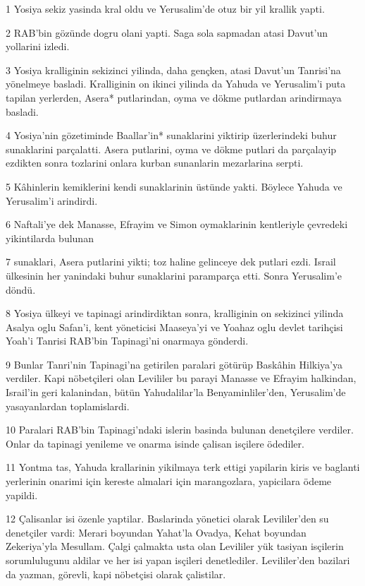 \par 1 Yosiya sekiz yasinda kral oldu ve Yerusalim'de otuz bir yil krallik yapti.
\par 2 RAB'bin gözünde dogru olani yapti. Saga sola sapmadan atasi Davut'un yollarini izledi.
\par 3 Yosiya kralliginin sekizinci yilinda, daha gençken, atasi Davut'un Tanrisi'na yönelmeye basladi. Kralliginin on ikinci yilinda da Yahuda ve Yerusalim'i puta tapilan yerlerden, Asera* putlarindan, oyma ve dökme putlardan arindirmaya basladi.
\par 4 Yosiya'nin gözetiminde Baallar'in* sunaklarini yiktirip üzerlerindeki buhur sunaklarini parçalatti. Asera putlarini, oyma ve dökme putlari da parçalayip ezdikten sonra tozlarini onlara kurban sunanlarin mezarlarina serpti.
\par 5 Kâhinlerin kemiklerini kendi sunaklarinin üstünde yakti. Böylece Yahuda ve Yerusalim'i arindirdi.
\par 6 Naftali'ye dek Manasse, Efrayim ve Simon oymaklarinin kentleriyle çevredeki yikintilarda bulunan
\par 7 sunaklari, Asera putlarini yikti; toz haline gelinceye dek putlari ezdi. Israil ülkesinin her yanindaki buhur sunaklarini paramparça etti. Sonra Yerusalim'e döndü.
\par 8 Yosiya ülkeyi ve tapinagi arindirdiktan sonra, kralliginin on sekizinci yilinda Asalya oglu Safan'i, kent yöneticisi Maaseya'yi ve Yoahaz oglu devlet tarihçisi Yoah'i Tanrisi RAB'bin Tapinagi'ni onarmaya gönderdi.
\par 9 Bunlar Tanri'nin Tapinagi'na getirilen paralari götürüp Baskâhin Hilkiya'ya verdiler. Kapi nöbetçileri olan Levililer bu parayi Manasse ve Efrayim halkindan, Israil'in geri kalanindan, bütün Yahudalilar'la Benyaminliler'den, Yerusalim'de yasayanlardan toplamislardi.
\par 10 Paralari RAB'bin Tapinagi'ndaki islerin basinda bulunan denetçilere verdiler. Onlar da tapinagi yenileme ve onarma isinde çalisan isçilere ödediler.
\par 11 Yontma tas, Yahuda krallarinin yikilmaya terk ettigi yapilarin kiris ve baglanti yerlerinin onarimi için kereste almalari için marangozlara, yapicilara ödeme yapildi.
\par 12 Çalisanlar isi özenle yaptilar. Baslarinda yönetici olarak Levililer'den su denetçiler vardi: Merari boyundan Yahat'la Ovadya, Kehat boyundan Zekeriya'yla Mesullam. Çalgi çalmakta usta olan Levililer yük tasiyan isçilerin sorumlulugunu aldilar ve her isi yapan isçileri denetlediler. Levililer'den bazilari da yazman, görevli, kapi nöbetçisi olarak çalistilar.
